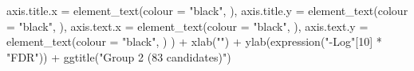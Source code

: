 \documentclass[
  11pt,
  oneside]{book}
\newenvironment{Shaded}{\begin{snugshade}}{\end{snugshade}}
\newcommand{\AttributeTok}[1]{\textcolor[rgb]{0.77,0.63,0.00}{#1}}
\newcommand{\DecValTok}[1]{\textcolor[rgb]{0.00,0.00,0.81}{#1}}
\newcommand{\FunctionTok}[1]{\textcolor[rgb]{0.00,0.00,0.00}{#1}}
\newcommand{\NormalTok}[1]{#1}
\newcommand{\SpecialCharTok}[1]{\textcolor[rgb]{0.00,0.00,0.00}{#1}}
\newcommand{\StringTok}[1]{\textcolor[rgb]{0.31,0.60,0.02}{#1}}
\begin{document}
\begin{Shaded}
\begin{Highlighting}[]
    \AttributeTok{axis.title.x =} \FunctionTok{element\_text}\NormalTok{(}\AttributeTok{colour =} \StringTok{"black"}\NormalTok{, ),}
    \AttributeTok{axis.title.y =} \FunctionTok{element\_text}\NormalTok{(}\AttributeTok{colour =} \StringTok{"black"}\NormalTok{, ),}
    \AttributeTok{axis.text.x =} \FunctionTok{element\_text}\NormalTok{(}\AttributeTok{colour =} \StringTok{"black"}\NormalTok{, ),}
    \AttributeTok{axis.text.y =} \FunctionTok{element\_text}\NormalTok{(}\AttributeTok{colour =} \StringTok{"black"}\NormalTok{, )}
\NormalTok{  ) }\SpecialCharTok{+}
  \FunctionTok{xlab}\NormalTok{(}\StringTok{""}\NormalTok{) }\SpecialCharTok{+}
  \FunctionTok{ylab}\NormalTok{(}\FunctionTok{expression}\NormalTok{(}\StringTok{"{-}Log"}\NormalTok{[}\DecValTok{10}\NormalTok{] }\SpecialCharTok{*} \StringTok{"FDR"}\NormalTok{)) }\SpecialCharTok{+}
  \FunctionTok{ggtitle}\NormalTok{(}\StringTok{"Group 2 (83 candidates)"}\NormalTok{)}
\end{Highlighting}
\end{Shaded}
\end{document}
